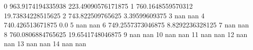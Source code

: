 0 963.9174194335938 223.49090576171875
1 760.1648559570312 19.73834228515625
2 743.822509765625 3.39599609375
3 nan nan
4 740.426513671875 0.0
5 nan nan
6 749.2557373046875 8.8292236328125
7 nan nan
8 760.0806884765625 19.6541748046875
9 nan nan
10 nan nan
11 nan nan
12 nan nan
13 nan nan
14 nan nan
